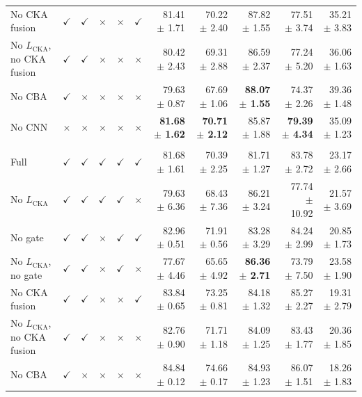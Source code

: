 \documentclass[10pt]{article}
\begin{document}
{\begin{longtable}{lccccc rrrrr}
No CKA fusion & $\checkmark$ & $\checkmark$ & $\times$ & $\times$ & $\checkmark$ & 81.41 $\pm$ 1.71 & 70.22 $\pm$ 2.40 & 87.82 $\pm$ 1.55 & 77.51 $\pm$ 3.74 & 35.21 $\pm$ 3.83 \\
No $L_{\mathrm{CKA}}$, no CKA fusion & $\checkmark$ & $\checkmark$ & $\times$ & $\times$ & $\times$ & 80.42 $\pm$ 2.43 & 69.31 $\pm$ 2.88 & 86.59 $\pm$ 2.37 & 77.24 $\pm$ 5.20 & 36.06 $\pm$ 1.63 \\
No CBA & $\checkmark$ & $\times$ & $\times$ & $\times$ & $\times$ & 79.63 $\pm$ 0.87 & 67.69 $\pm$ 1.06 & \textbf{88.07 $\pm$ 1.55} & 74.37 $\pm$ 2.26 & 39.36 $\pm$ 1.48 \\
No CNN & $\times$ & $\times$ & $\times$ & $\times$ & $\times$ & \textbf{81.68 $\pm$ 1.62} & \textbf{70.71 $\pm$ 2.12} & 85.87 $\pm$ 1.88 & \textbf{79.39 $\pm$ 4.34} & 35.09 $\pm$ 1.23 \\
\addlinespace[4pt]
\multicolumn{11}{l}{\textit{Source: USOVA $\rightarrow$ Target: OTU}} \\
\midrule
Full & $\checkmark$ & $\checkmark$ & $\checkmark$ & $\checkmark$ & $\checkmark$ & 81.68 $\pm$ 1.61 & 70.39 $\pm$ 2.25 & 81.71 $\pm$ 1.27 & 83.78 $\pm$ 2.72 & 23.17 $\pm$ 2.66 \\
No $L_{\mathrm{CKA}}$ & $\checkmark$ & $\checkmark$ & $\checkmark$ & $\checkmark$ & $\times$ & 79.63 $\pm$ 6.36 & 68.43 $\pm$ 7.36 & 86.21 $\pm$ 3.24 & 77.74 $\pm$ 10.92 & 21.57 $\pm$ 3.69 \\
No gate & $\checkmark$ & $\checkmark$ & $\times$ & $\checkmark$ & $\checkmark$ & 82.96 $\pm$ 0.51 & 71.91 $\pm$ 0.56 & 83.28 $\pm$ 3.29 & 84.24 $\pm$ 2.99 & 20.85 $\pm$ 1.73 \\
No $L_{\mathrm{CKA}}$, no gate & $\checkmark$ & $\checkmark$ & $\times$ & $\checkmark$ & $\times$ & 77.67 $\pm$ 4.46 & 65.65 $\pm$ 4.92 & \textbf{86.36 $\pm$ 2.71} & 73.79 $\pm$ 7.50 & 23.58 $\pm$ 1.90 \\
No CKA fusion & $\checkmark$ & $\checkmark$ & $\times$ & $\times$ & $\checkmark$ & 83.84 $\pm$ 0.65 & 73.25 $\pm$ 0.81 & 84.18 $\pm$ 1.32 & 85.27 $\pm$ 2.27 & 19.31 $\pm$ 2.79 \\
No $L_{\mathrm{CKA}}$, no CKA fusion & $\checkmark$ & $\checkmark$ & $\times$ & $\times$ & $\times$ & 82.76 $\pm$ 0.90 & 71.71 $\pm$ 1.18 & 84.09 $\pm$ 1.25 & 83.43 $\pm$ 1.77 & 20.36 $\pm$ 1.85 \\
No CBA & $\checkmark$ & $\times$ & $\times$ & $\times$ & $\times$ & 84.84 $\pm$ 0.12 & 74.66 $\pm$ 0.17 & 84.93 $\pm$ 1.23 & 86.07 $\pm$ 1.51 & 18.26 $\pm$ 1.83 \\

\end{longtable}}
\end{document}
